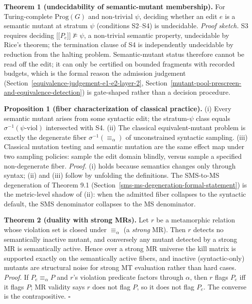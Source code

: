 \documentclass[12pt]{article}
\providecommand{\llbracket}{\mathopen{\lbrack\!\lbrack}}
\providecommand{\rrbracket}{\mathclose{\rbrack\!\rbrack}}
\begin{document}
\textbf{Theorem 1 (undecidability of semantic-mutant membership).} For
Turing-complete $\mathrm{Prog}(G)$ and non-trivial $\psi$, deciding
whether an edit $e$ is a semantic mutant at stratum $\psi$
(conditions S2--S4) is undecidable. \emph{Proof sketch.} S3 requires
deciding $\llbracket P_e \rrbracket \not\models \psi$, a non-trivial
semantic property, undecidable by Rice's theorem; the termination clause
of S4 is independently undecidable by reduction from the halting
problem. Semantic-mutant status therefore cannot be read off the edit;
it can only be certified on bounded fragments with recorded budgets,
which is the formal reason the admission judgement (Section~\ref{equivalence-judgement-e1-e2-layer-2}, Section~\ref{mutant-pool-prescreen-and-equivalence-detection}) is
gate-shaped rather than a decision procedure.

\textbf{Proposition 1 (fiber characterization of classical practice).}
(i) Every semantic mutant arises from some syntactic edit; the
stratum-$\psi$ class equals $\sigma^{-1}(\psi\text{-viol})$ intersected
with S4. (ii) The classical equivalent-mutant problem is exactly the
degenerate fiber $\sigma^{-1}(\equiv_\alpha)$ of unconstrained syntactic
sampling. (iii) Classical mutation testing and semantic mutation are the
same effect map under two sampling policies: sample the edit domain
blindly, versus sample a specified non-degenerate fiber. \emph{Proof.}
(i) holds because semantics changes only through syntax; (ii) and (iii)
follow by unfolding the definitions. The SMS-to-MS degeneration of
Theorem 9.1 (Section~\ref{sms-ms-degeneration-formal-statement}) is the metric-level shadow of (ii): when the admitted
fiber collapses to the syntactic default, the SMS denominator collapses
to the MS denominator.

\textbf{Theorem 2 (duality with strong MRs).} Let $r$ be a
metamorphic relation whose violation set is closed under $\equiv_\alpha$
(a \emph{strong} MR). Then $r$ detects no semantically inactive
mutant, and conversely any mutant detected by a strong MR is
semantically active. Hence over a strong MR universe the kill matrix
is supported exactly on the semantically active fibers, and inactive
(syntactic-only) mutants are structural noise for strong MT evaluation
rather than hard cases. \emph{Proof.} If $P_e \equiv_\alpha P$ and $r$'s
violation predicate factors through $\alpha$, then $r$ flags $P_e$ iff
it flags $P$; MR validity says $r$ does not flag $P$, so it does not
flag $P_e$. The converse is the contrapositive. $\square$
\end{document}

